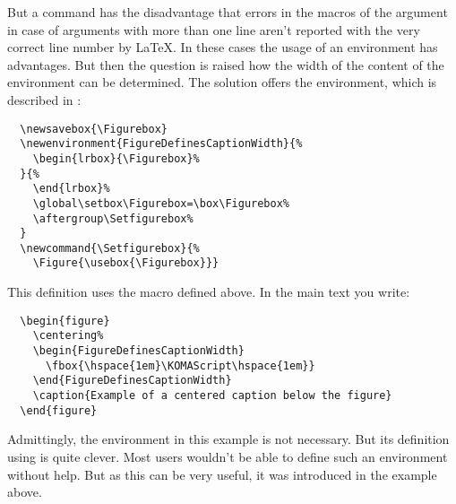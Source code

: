 \begin{Example}
  But a command has the disadvantage that errors in the macros of the
  argument in case of arguments with more than one line aren't
  reported with the very correct line number by \LaTeX{}. In these
  cases the usage of an environment has advantages. But then the
  question is raised how the width of the content of the environment
  can be determined. The solution offers the 
  environment, which is described in \cite{latex:usrguide}:
\begin{lstlisting}
  \newsavebox{\Figurebox}
  \newenvironment{FigureDefinesCaptionWidth}{%
    \begin{lrbox}{\Figurebox}%
  }{%
    \end{lrbox}%
    \global\setbox\Figurebox=\box\Figurebox%
    \aftergroup\Setfigurebox%
  }
  \newcommand{\Setfigurebox}{%
    \Figure{\usebox{\Figurebox}}}
\end{lstlisting}
  This definition uses the macro  defined above.  In
  the main text you write:
\begin{lstlisting}
  \begin{figure}
    \centering%
    \begin{FigureDefinesCaptionWidth}
      \fbox{\hspace{1em}\KOMAScript\hspace{1em}}
    \end{FigureDefinesCaptionWidth}
    \caption{Example of a centered caption below the figure}
  \end{figure}
\end{lstlisting}
  Admittingly, the environment in this example is not necessary. But
  its definition using  is quite clever. Most users
  wouldn't be able to define such an environment without help. But as
  this can be very useful, it was introduced in the example above.
  

\end{Example}
